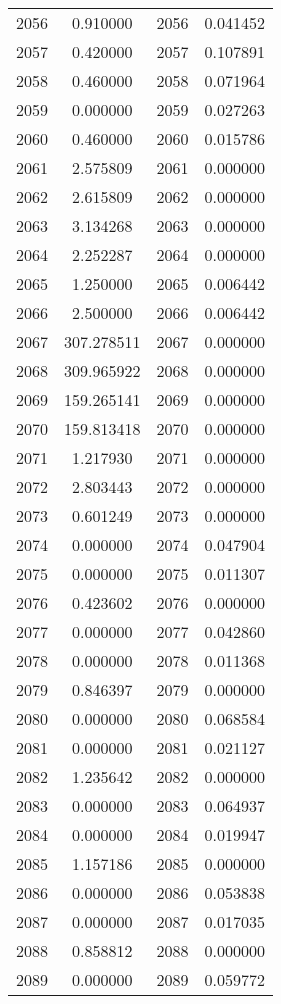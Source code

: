 \documentclass[12pt]{article}
\begin{document}
\begin{longtable}{@{}cccc@{}}
2056 & 0.910000 & 2056 & 0.041452 \\
2057 & 0.420000 & 2057 & 0.107891 \\
2058 & 0.460000 & 2058 & 0.071964 \\
2059 & 0.000000 & 2059 & 0.027263 \\
2060 & 0.460000 & 2060 & 0.015786 \\
2061 & 2.575809 & 2061 & 0.000000 \\
2062 & 2.615809 & 2062 & 0.000000 \\
2063 & 3.134268 & 2063 & 0.000000 \\
2064 & 2.252287 & 2064 & 0.000000 \\
2065 & 1.250000 & 2065 & 0.006442 \\
2066 & 2.500000 & 2066 & 0.006442 \\
2067 & 307.278511 & 2067 & 0.000000 \\
2068 & 309.965922 & 2068 & 0.000000 \\
2069 & 159.265141 & 2069 & 0.000000 \\
2070 & 159.813418 & 2070 & 0.000000 \\
2071 & 1.217930 & 2071 & 0.000000 \\
2072 & 2.803443 & 2072 & 0.000000 \\
2073 & 0.601249 & 2073 & 0.000000 \\
2074 & 0.000000 & 2074 & 0.047904 \\
2075 & 0.000000 & 2075 & 0.011307 \\
2076 & 0.423602 & 2076 & 0.000000 \\
2077 & 0.000000 & 2077 & 0.042860 \\
2078 & 0.000000 & 2078 & 0.011368 \\
2079 & 0.846397 & 2079 & 0.000000 \\
2080 & 0.000000 & 2080 & 0.068584 \\
2081 & 0.000000 & 2081 & 0.021127 \\
2082 & 1.235642 & 2082 & 0.000000 \\
2083 & 0.000000 & 2083 & 0.064937 \\
2084 & 0.000000 & 2084 & 0.019947 \\
2085 & 1.157186 & 2085 & 0.000000 \\
2086 & 0.000000 & 2086 & 0.053838 \\
2087 & 0.000000 & 2087 & 0.017035 \\
2088 & 0.858812 & 2088 & 0.000000 \\
2089 & 0.000000 & 2089 & 0.059772 \\

\end{longtable}
\end{document}
